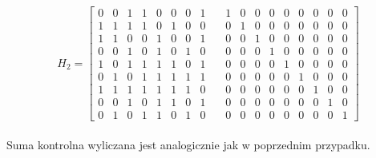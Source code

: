 \documentclass[a4paper, portrait,11pt]{article}
\begin{document}
$$H_2 = \left[\begin{array}{cccccccccccccccccc}
0 & 0 & 1 & 1 & 0 & 0 & 0 & 1 & \, & 1 & 0 & 0 & 0 & 0 & 0 & 0 & 0 & 0 \\
1 & 1 & 1 & 1 & 0 & 1 & 0 & 0 & \, & 0 & 1 & 0 & 0 & 0 & 0 & 0 & 0 & 0 \\
1 & 1 & 0 & 0 & 1 & 0 & 0 & 1 & \, & 0 & 0 & 1 & 0 & 0 & 0 & 0 & 0 & 0 \\
0 & 0 & 1 & 0 & 1 & 0 & 1 & 0 & \, & 0 & 0 & 0 & 1 & 0 & 0 & 0 & 0 & 0 \\
1 & 0 & 1 & 1 & 1 & 1 & 0 & 1 & \, & 0 & 0 & 0 & 0 & 1 & 0 & 0 & 0 & 0 \\
0 & 1 & 0 & 1 & 1 & 1 & 1 & 1 & \, & 0 & 0 & 0 & 0 & 0 & 1 & 0 & 0 & 0 \\
1 & 1 & 1 & 1 & 1 & 1 & 1 & 0 & \, & 0 & 0 & 0 & 0 & 0 & 0 & 1 & 0 & 0 \\
0 & 0 & 1 & 0 & 1 & 1 & 0 & 1 & \, & 0 & 0 & 0 & 0 & 0 & 0 & 0 & 1 & 0 \\
0 & 1 & 0 & 1 & 1 & 0 & 1 & 0 & \, & 0 & 0 & 0 & 0 & 0 & 0 & 0 & 0 & 1
\end{array}\right]$$
\\
Suma kontrolna wyliczana jest analogicznie jak w poprzednim przypadku.
\newpage
\end{document}
